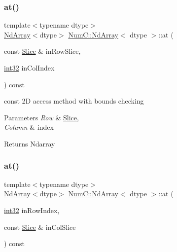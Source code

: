 \subsubsection{\texorpdfstring{at()}{at()}\hspace{0.1cm}{\footnotesize\ttfamily [7/8]}}
{\footnotesize\ttfamily template$<$typename dtype$>$ \\
\mbox{\hyperlink{class_num_c_1_1_nd_array}{Nd\+Array}}$<$dtype$>$ \mbox{\hyperlink{class_num_c_1_1_nd_array}{Num\+C\+::\+Nd\+Array}}$<$ dtype $>$\+::at (\begin{DoxyParamCaption}\item[{const \mbox{\hyperlink{class_num_c_1_1_slice}{Slice}} \&}]{in\+Row\+Slice,  }\item[{\mbox{\hyperlink{namespace_num_c_aa5a7e69266097d55816d4cdb19542b53}{int32}}}]{in\+Col\+Index }\end{DoxyParamCaption}) const\hspace{0.3cm}{\ttfamily [inline]}}

const 2D access method with bounds checking


\begin{DoxyParams}{Parameters}
{\em Row} & \mbox{\hyperlink{class_num_c_1_1_slice}{Slice}}, \\
\hline
{\em Column} & index \\
\hline
\end{DoxyParams}
\begin{DoxyReturn}{Returns}
Ndarray 
\end{DoxyReturn}
\mbox{\label{class_num_c_1_1_nd_array_ab54ef20be682805145902d979e9a0c44}} 
\subsubsection{\texorpdfstring{at()}{at()}\hspace{0.1cm}{\footnotesize\ttfamily [8/8]}}
{\footnotesize\ttfamily template$<$typename dtype$>$ \\
\mbox{\hyperlink{class_num_c_1_1_nd_array}{Nd\+Array}}$<$dtype$>$ \mbox{\hyperlink{class_num_c_1_1_nd_array}{Num\+C\+::\+Nd\+Array}}$<$ dtype $>$\+::at (\begin{DoxyParamCaption}\item[{\mbox{\hyperlink{namespace_num_c_aa5a7e69266097d55816d4cdb19542b53}{int32}}}]{in\+Row\+Index,  }\item[{const \mbox{\hyperlink{class_num_c_1_1_slice}{Slice}} \&}]{in\+Col\+Slice }\end{DoxyParamCaption}) const\hspace{0.3cm}{\ttfamily [inline]}}


